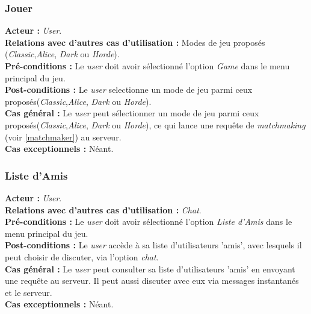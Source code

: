 \documentclass[10pt, a4paper]{article}
\begin{document}
\subsubsection{Jouer}

\textbf{Acteur :} \textit{User}.\\
\textbf{Relations avec d'autres cas d'utilisation :} Modes de jeu proposés (\textit{Classic},\textit{Alice}, \textit{Dark} ou \textit{Horde}).\\
\textbf{Pré-conditions :} Le \textit{user} doit avoir sélectionné l'option \textit{Game} dans le menu principal du jeu.\\
\textbf{Post-conditions :} Le \textit{user} selectionne un mode de jeu parmi ceux proposés(\textit{Classic},\textit{Alice}, \textit{Dark} ou \textit{Horde}).\\
\textbf{Cas général :} Le \textit{user} peut sélectionner un mode de jeu parmi ceux proposés(\textit{Classic},\textit{Alice}, \textit{Dark} ou \textit{Horde}), ce qui lance une requête de \textit{matchmaking} (voir \ref{matchmaker}) au serveur.\\
\textbf{Cas exceptionnels :} Néant.

\subsubsection{Liste d'Amis}

\textbf{Acteur :} \textit{User}.\\
\textbf{Relations avec d'autres cas d'utilisation :} \textit{Chat}.\\
\textbf{Pré-conditions :} Le \textit{user} doit avoir sélectionné l'option \textit{Liste d'Amis} dans le menu principal du jeu.\\
\textbf{Post-conditions :} Le \textit{user} accède à sa liste d'utilisateurs 'amis', avec lesquels il peut choisir de discuter, via l'option \textit{chat}.\\
\textbf{Cas général :} Le \textit{user} peut consulter sa liste d'utilisateurs 'amis' en envoyant une requête au serveur. Il peut aussi discuter avec eux via messages instantanés et le serveur.\\
\textbf{Cas exceptionnels :} Néant.
		
\end{document}
